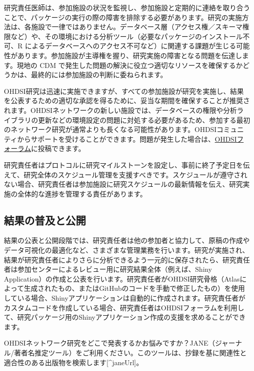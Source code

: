 \documentclass[
  11pt]{book}
\makeatletter
\newenvironment{kframe}{%
\medskip{}
\setlength{\fboxsep}{.8em}
 \def\at@end@of@kframe{}%
 \ifinner\ifhmode%
  \def\at@end@of@kframe{\end{minipage}}%
  \begin{minipage}{\columnwidth}%
 \fi\fi%
 \def\FrameCommand##1{\hskip\@totalleftmargin \hskip-\fboxsep
 \colorbox{myShadeColor}{##1}\hskip-\fboxsep
     \hskip-\linewidth \hskip-\@totalleftmargin \hskip\columnwidth}%
 \MakeFramed {\advance\hsize-\width
   \@totalleftmargin\z@ \linewidth\hsize
   \@setminipage}}%
 {\par\unskip\endMakeFramed%
 \at@end@of@kframe}
\newenvironment{rmdblock}[1]
  {
  \begin{itemize}
  \renewcommand{\labelitemi}{
    \raisebox{-.7\height}[0pt][0pt]{
      {\setkeys{Gin}{width=3em,keepaspectratio}\texttt{[image: images/\#1]}}
    }
  }
  \setlength{\fboxsep}{1em}
  \begin{kframe}
  \item
  }
  {
  \end{kframe}
  \end{itemize}
  }
\newenvironment{rmdimportant}
  {\begin{rmdblock}{important}}
  {\end{rmdblock}}
\theoremstyle{definition}
\theoremstyle{definition}
\theoremstyle{definition}
\theoremstyle{definition}
\theoremstyle{remark}
\makeatother
\begin{document}
研究責任医師は、参加施設の状況を監視し、参加施設と定期的に連絡を取り合うことで、パッケージの実行の際の障害を排除する必要があります。研究の実施方法は、各施設で一律ではありません。データベース層（アクセス権／スキーマ権限など）や、その環境における分析ツール（必要なパッケージのインストール不可、R によるデータベースへのアクセス不可など）に関連する課題が生じる可能性があります。参加施設が主導権を握り、研究実施の障害となる問題を伝達します。現地の CDM で発生した問題の解決に役立つ適切なリソースを確保するかどうかは、最終的には参加施設の判断に委ねられます。

OHDSI研究は迅速に実施できますが、すべての参加施設が研究を実施し、結果を公表するための適切な承認を得るために、妥当な期間を確保することが推奨されます。OHDSIネットワークの新しい施設では、データベースの権限や分析ライブラリの更新などの環境設定の問題に対処する必要があるため、参加する最初のネットワーク研究が通常よりも長くなる可能性があります。OHDSIコミュニティからサポートを受けることができます。問題が発生した場合は、\href{http://forums.ohdsi.org/}{OHDSIフォーラム}に投稿できます。

研究責任者はプロトコルに研究マイルストーンを設定し、事前に終了予定日を伝えて、研究全体のスケジュール管理を支援すべきです。スケジュールが遵守されない場合、研究責任者は参加施設に研究スケジュールの最新情報を伝え、研究実施の全体的な進捗を管理する責任があります。

\subsection{結果の普及と公開}\label{ux7d50ux679cux306eux666eux53caux3068ux516cux958b}

結果の公表と公開段階では、研究責任者は他の参加者と協力して、原稿の作成やデータ可視化の最適化など、さまざまな管理業務を行います。研究が実施され、結果が研究責任者によりさらに分析できるよう一元的に保存されたら、研究責任者は参加センターによるレビュー用に研究結果全体（例えば、Shiny Application）の作成と公表を行います。研究責任者がOHDSI研究骨格（Atlasによって生成されたもの、またはGitHubのコードを手動で修正したもの）を使用している場合、Shinyアプリケーションは自動的に作成されます。研究責任者がカスタムコードを作成している場合、研究責任者はOHDSIフォーラムを利用して、研究パッケージ用のShinyアプリケーション作成の支援を求めることができます。

\begin{rmdimportant}
OHDSIネットワーク研究をどこで発表するかお悩みですか？JANE（ジャーナル/著者名推定ツール）をご利用ください。このツールは、抄録を基に関連性と適合性のある出版物を検索します{[}\^{}janeUrl{]}。
\end{rmdimportant}
\end{document}
